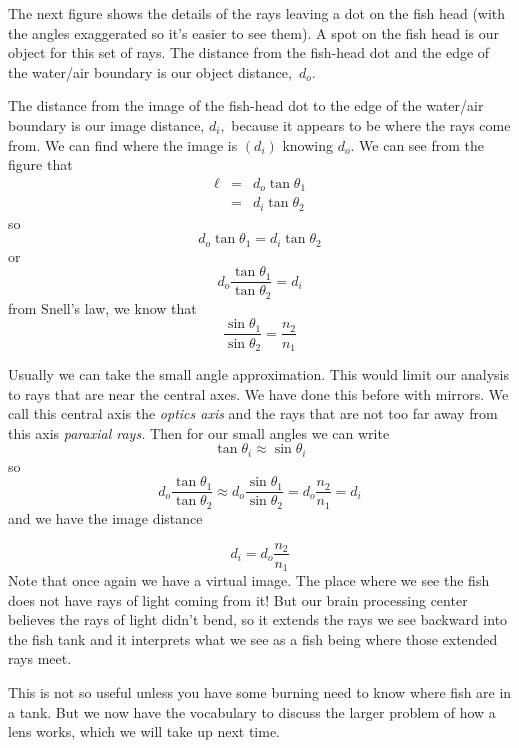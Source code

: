 \documentclass{article}
\begin{document}
The next figure shows the details of the rays leaving a dot on the fish head
(with the angles exaggerated so it's easier to see them). A spot on the fish head is our
object for this set of rays. The distance from the fish-head dot and the
edge of the water/air boundary is our object distance,\emph{\ }$d_{o}.$

The distance from the image of the fish-head dot to the edge of the
water/air boundary is our image distance, $d_{i},$ because it appears to be
where the rays come from. We can find where the image is $\left(
d_{i}\right) $ knowing $d_{o}.$ We can see from the figure that%
\begin{eqnarray*}
\ell &=&d_{o}\tan \theta _{1} \\
&=&d_{i}\tan \theta _{2}
\end{eqnarray*}%
so%
\[
d_{o}\tan \theta _{1}=d_{i}\tan \theta _{2}
\]%
or%
\[
d_{o}\frac{\tan \theta _{1}}{\tan \theta _{2}}=d_{i}
\]%
from Snell's law, we know that 
\[
\frac{\sin \theta _{1}}{\sin \theta _{2}}=\frac{n_{2}}{n_{1}}
\]

Usually we can take the small angle approximation. This would limit our
analysis to rays that are near the central axes. We have done this before
with mirrors. We call this central axis the \emph{optics axis} and the rays
that are not too far away from this axis \emph{paraxial rays.} Then for our
small angles we can write 
\[
\tan \theta _{i}\approx \sin \theta _{i}
\]%
so%
\[
d_{o}\frac{\tan \theta _{1}}{\tan \theta _{2}}\approx d_{o}\frac{\sin \theta
_{1}}{\sin \theta _{2}}=d_{o}\frac{n_{2}}{n_{1}}=d_{i}
\]%
and we have the image distance

\[
d_{i}=d_{o}\frac{n_{2}}{n_{1}}
\]%
Note that once again we have a virtual image. The place where we see the
fish does not have rays of light coming from it! But our brain processing
center believes the rays of light didn't bend, so it extends the rays we see
backward into the fish tank and it interprets what we see as a fish being
where those extended rays meet.

This is not so useful unless you have some burning need to know where fish
are in a tank. But we now have the vocabulary to discuss the larger problem
of how a lens works, which we will take up next time.
\end{document}
